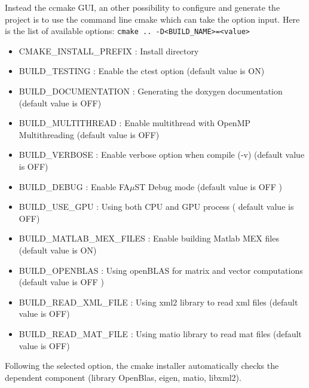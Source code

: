 Instead the ccmake GUI, an other possibility to configure and generate the project is to use the command line cmake which can take the option input. Here is the list of available options: 
\texttt{cmake\ ..\ -D<BUILD\_NAME>=<value>}

\begin{itemize}
\item CMAKE\_INSTALL\_PREFIX : Install directory
\item BUILD\_TESTING : Enable the ctest option (default value is ON)
\item BUILD\_DOCUMENTATION : Generating the doxygen documentation (default value is OFF)  
\item BUILD\_MULTITHREAD : Enable multithread with OpenMP Multithreading (default value is OFF)
\item BUILD\_VERBOSE : Enable verbose option when compile (-v) (default value is OFF)
\item BUILD\_DEBUG : Enable FA$\mu$ST Debug mode (default value is OFF )
\item BUILD\_USE\_GPU : Using both CPU and GPU process ( default value is OFF)
\item BUILD\_MATLAB\_MEX\_FILES : Enable building Matlab MEX files (default value is ON)
\item BUILD\_OPENBLAS : Using openBLAS for matrix and vector computations (default value is OFF )
\item BUILD\_READ\_XML\_FILE : Using xml2 library to read xml files (default value is OFF)
\item BUILD\_READ\_MAT\_FILE : Using matio library to read mat files (default value is OFF)
\end{itemize}

Following the selected option, the cmake installer automatically checks the dependent component (library OpenBlas, eigen, matio, libxml2).  




